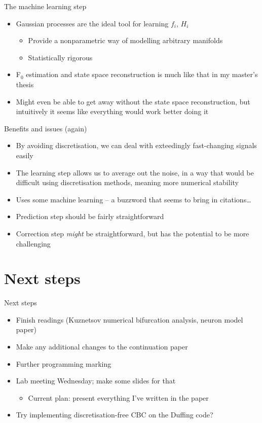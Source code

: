 \documentclass[presentation]{beamer}
\begin{document}
\begin{frame}[label={sec:org75b1813}]{The machine learning step}
\begin{itemize}
\item Gaussian processes are the ideal tool for learning \(f_i\), \(H_i\)
\begin{itemize}
\item Provide a nonparametric way of modelling arbitrary manifolds
\item Statistically rigorous
\end{itemize}
\item F\(_{\text{0}}\) estimation and state space reconstruction is much like that in my master's thesis
\item Might even be able to get away without the state space reconstruction, but intuitively it seems like everything would work better doing it
\end{itemize}
\end{frame}


\begin{frame}[label={sec:orgf36297e}]{Benefits and issues (again)}
\begin{itemize}
\item By avoiding discretisation, we can deal with exteedingly fast-changing signals easily
\item The learning step allows us to average out the noise, in a way that would be difficult using discretisation methods, meaning more numerical stability
\item Uses some machine learning -- a buzzword that seems to bring in citations\ldots{}
\item Prediction step should be fairly straightforward
\item Correction step \emph{might} be straightforward, but has the potential to be more challenging
\end{itemize}
\end{frame}

\section{Next steps}
\label{sec:org6251a10}
\begin{frame}[label={sec:org065d0c7}]{Next steps}
\begin{itemize}
\item Finish readings (Kuznetsov numerical bifurcation analysis, neuron model paper)
\item Make any additional changes to the continuation paper
\item Further programming marking
\item Lab meeting Wednesday; make some slides for that
\begin{itemize}
\item Current plan: present everything I've written in the paper
\end{itemize}
\item Try implementing discretisation-free CBC on the Duffing code?
\end{itemize}
\end{frame}
\end{document}
